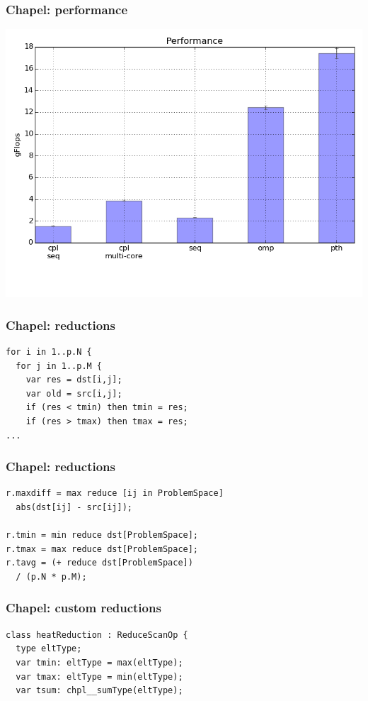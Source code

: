 \documentclass{beamer}
\begin{document}
\begin{frame}
 \frametitle{Chapel: performance}
 \includegraphics[width=\textwidth]{../cpl/report/per_no_reductions.png}
\end{frame}

\begin{frame}[fragile]
 \frametitle{Chapel: reductions}
\begin{verbatim}
for i in 1..p.N {
  for j in 1..p.M {
    var res = dst[i,j];
    var old = src[i,j];
    if (res < tmin) then tmin = res;
    if (res > tmax) then tmax = res;
...
\end{verbatim}
\end{frame}

\begin{frame}[fragile]
 \frametitle{Chapel: reductions}
\begin{verbatim}
r.maxdiff = max reduce [ij in ProblemSpace]
  abs(dst[ij] - src[ij]);

r.tmin = min reduce dst[ProblemSpace];
r.tmax = max reduce dst[ProblemSpace];
r.tavg = (+ reduce dst[ProblemSpace])
  / (p.N * p.M);
\end{verbatim}
\end{frame}

\begin{frame}[fragile]
 \frametitle{Chapel: custom reductions}
\begin{verbatim}
class heatReduction : ReduceScanOp {
  type eltType;
  var tmin: eltType = max(eltType);
  var tmax: eltType = min(eltType);
  var tsum: chpl__sumType(eltType);
\end{verbatim}
\end{frame}
\end{document}
